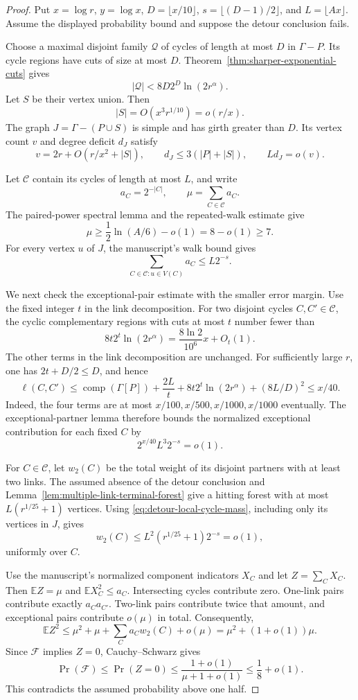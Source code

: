 \begin{proof}
Put $x=\log r$, $y=\log x$, $D=\lfloor x/10\rfloor$, $s=\lfloor(D-1)/2\rfloor$, and $L=\lfloor Ax\rfloor$.
Assume the displayed probability bound and suppose the detour conclusion fails.

Choose a maximal disjoint family $\mathcal Q$ of cycles of length at most $D$ in $\Gamma-P$.
Its cycle regions have cuts of size at most $D$.
Theorem~\ref{thm:sharper-exponential-cuts} gives
\[
 |\mathcal Q|<8D2^D\ln(2r^\alpha).
\]
Let $S$ be their vertex union.
Then
\[
 |S|=O(x^3r^{1/10})=o(r/x).
\]
The graph $J=\Gamma-(P\cup S)$ is simple and has girth greater than $D$.
Its vertex count $v$ and degree deficit $d_J$ satisfy
\[
 v=2r+O(r/x^2+|S|),\qquad
 d_J\le3(|P|+|S|),\qquad Ld_J=o(v).
\]

Let $\mathcal C$ contain its cycles of length at most $L$, and write
\[
 a_C=2^{-|C|},\qquad \mu=\sum_{C\in\mathcal C}a_C.
\]
The paired-power spectral lemma and the repeated-walk estimate give
\[
 \mu\ge\frac12\ln(A/6)-o(1)=8-o(1)\ge7.
\]
For every vertex $u$ of $J$, the manuscript's walk bound gives
\begin{equation}\label{eq:detour-local-cycle-mass}
 \sum_{C\in\mathcal C:u\in V(C)}a_C\le L2^{-s}.
\end{equation}

We next check the exceptional-pair estimate with the smaller error margin.
Use the fixed integer $t$ in the link decomposition.
For two disjoint cycles $C,C'\in\mathcal C$, the cyclic complementary regions with cuts at most $t$ number fewer than
\[
 8t2^t\ln(2r^\alpha)
 =\frac{8\ln2}{10^6}x+O_t(1).
\]
The other terms in the link decomposition are unchanged.
For sufficiently large $r$, one has $2t+D/2\le D$, and hence
\[
 \ell(C,C')\le \operatorname{comp}(\Gamma[P])
 +\frac{2L}{t}+8t2^t\ln(2r^\alpha)+(8L/D)^2
 \le x/40.
\]
Indeed, the four terms are at most $x/100,x/500,x/1000,x/1000$ eventually.
The exceptional-partner lemma therefore bounds the normalized exceptional contribution for each fixed $C$ by
\[
 2^{x/40}L^3 2^{-s}=o(1).
\]

For $C\in\mathcal C$, let $w_2(C)$ be the total weight of its disjoint partners with at least two links.
The assumed absence of the detour conclusion and Lemma~\ref{lem:multiple-link-terminal-forest} give a hitting forest with at most $L(r^{1/25}+1)$ vertices.
Using \eqref{eq:detour-local-cycle-mass}, including only its vertices in $J$, gives
\[
 w_2(C)\le L^2(r^{1/25}+1)2^{-s}=o(1),
\]
uniformly over $C$.

Use the manuscript's normalized component indicators $X_C$ and let $Z=\sum_CX_C$.
Then $\mathbb EZ=\mu$ and $\mathbb EX_C^2\le a_C$.
Intersecting cycles contribute zero.
One-link pairs contribute exactly $a_Ca_{C'}$.
Two-link pairs contribute twice that amount, and exceptional pairs contribute $o(\mu)$ in total.
Consequently,
\[
 \mathbb EZ^2
 \le\mu^2+\mu+\sum_Ca_Cw_2(C)+o(\mu)
 =\mu^2+(1+o(1))\mu.
\]
Since $\mathcal F$ implies $Z=0$, Cauchy--Schwarz gives
\[
 \Pr(\mathcal F)\le\Pr(Z=0)
 \le\frac{1+o(1)}{\mu+1+o(1)}\le\frac18+o(1).
\]
This contradicts the assumed probability above one half.
\end{proof}

